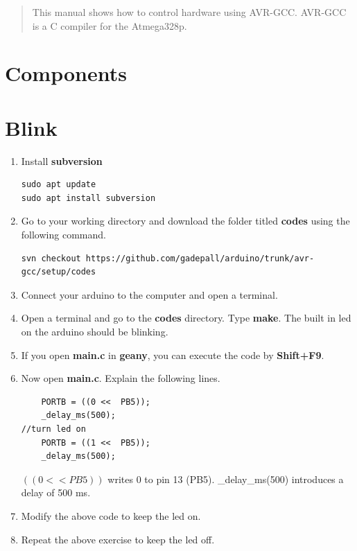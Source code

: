 \documentclass[journal,12pt,twocolumn]{IEEEtran}
\begin{document}
\tableofcontents

\bigskip

%
%
\begin{abstract}
This manual shows how to control hardware using AVR-GCC. AVR-GCC
is a C compiler for the Atmega328p.
\end{abstract}
\renewcommand{\thefigure}{\theenumi}
\renewcommand{\thetable}{\theenumi}
\section{Components}

%
\section{Blink}
\begin{enumerate}[1.]
\item Install \textbf{subversion}
\begin{lstlisting}
sudo apt update
sudo apt install subversion
\end{lstlisting}
\item Go to your working directory and download the folder titled \textbf{codes} using the following command.
\begin{lstlisting}
svn checkout https://github.com/gadepall/arduino/trunk/avr-gcc/setup/codes
\end{lstlisting}
\item Connect your arduino to the computer and open a terminal. 
\item Open a terminal and go to  the \textbf{codes} directory.  Type \textbf{make}.  The built in led on the arduino should be blinking.
\item If you open \textbf{main.c} in \textbf{geany}, you can execute the code by \textbf{Shift+F9}.

\item Now open \textbf{main.c}. Explain the following lines.
\begin{lstlisting}
    PORTB = ((0 <<  PB5));
	_delay_ms(500);
//turn led on
    PORTB = ((1 <<  PB5));
    _delay_ms(500);
\end{lstlisting}
\solution $((0 <<  PB5))$ writes 0 to pin 13 (PB5).  \_delay\_ms(500) introduces a delay of 500 ms.  
\item Modify the above code to keep the led on.
\item Repeat the above exercise to keep the led off.

\end{enumerate}
\end{document}
